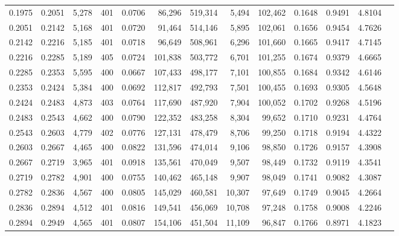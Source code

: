 \begin{tabular}{rrrrrrrrrrrrr}
0.1975 & 0.2051 & 5,278 & 401 &                                     0.0706 &  86,296 & 519,314 &   5,494 & 102,462 & 0.1648 & 0.9491 & 4.8104 \\
0.2051 & 0.2142 & 5,168 & 401 &                                     0.0720 &  91,464 & 514,146 &   5,895 & 102,061 & 0.1656 & 0.9454 & 4.7626 \\
0.2142 & 0.2216 & 5,185 & 401 &                                     0.0718 &  96,649 & 508,961 &   6,296 & 101,660 & 0.1665 & 0.9417 & 4.7145 \\
0.2216 & 0.2285 & 5,189 & 405 &                                     0.0724 & 101,838 & 503,772 &   6,701 & 101,255 & 0.1674 & 0.9379 & 4.6665 \\
0.2285 & 0.2353 & 5,595 & 400 &                                     0.0667 & 107,433 & 498,177 &   7,101 & 100,855 & 0.1684 & 0.9342 & 4.6146 \\
0.2353 & 0.2424 & 5,384 & 400 &                                     0.0692 & 112,817 & 492,793 &   7,501 & 100,455 & 0.1693 & 0.9305 & 4.5648 \\
0.2424 & 0.2483 & 4,873 & 403 &                                     0.0764 & 117,690 & 487,920 &   7,904 & 100,052 & 0.1702 & 0.9268 & 4.5196 \\
0.2483 & 0.2543 & 4,662 & 400 &                                     0.0790 & 122,352 & 483,258 &   8,304 &  99,652 & 0.1710 & 0.9231 & 4.4764 \\
0.2543 & 0.2603 & 4,779 & 402 &                                     0.0776 & 127,131 & 478,479 &   8,706 &  99,250 & 0.1718 & 0.9194 & 4.4322 \\
0.2603 & 0.2667 & 4,465 & 400 &                                     0.0822 & 131,596 & 474,014 &   9,106 &  98,850 & 0.1726 & 0.9157 & 4.3908 \\
0.2667 & 0.2719 & 3,965 & 401 &                                     0.0918 & 135,561 & 470,049 &   9,507 &  98,449 & 0.1732 & 0.9119 & 4.3541 \\
0.2719 & 0.2782 & 4,901 & 400 &                                     0.0755 & 140,462 & 465,148 &   9,907 &  98,049 & 0.1741 & 0.9082 & 4.3087 \\
0.2782 & 0.2836 & 4,567 & 400 &                                     0.0805 & 145,029 & 460,581 &  10,307 &  97,649 & 0.1749 & 0.9045 & 4.2664 \\
0.2836 & 0.2894 & 4,512 & 401 &                                     0.0816 & 149,541 & 456,069 &  10,708 &  97,248 & 0.1758 & 0.9008 & 4.2246 \\
0.2894 & 0.2949 & 4,565 & 401 &                                     0.0807 & 154,106 & 451,504 &  11,109 &  96,847 & 0.1766 & 0.8971 & 4.1823 \\

\end{tabular}
